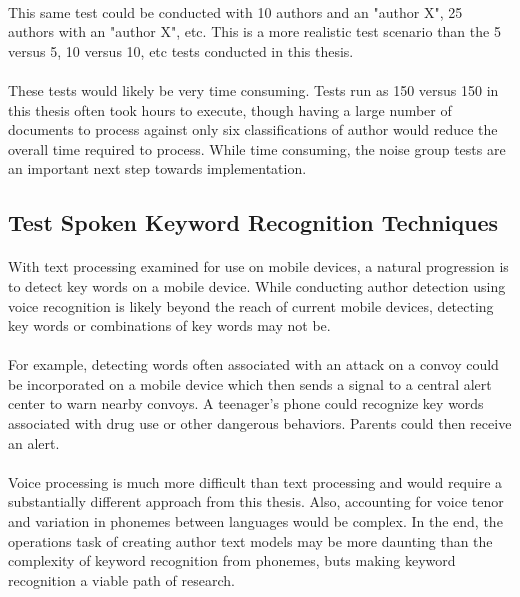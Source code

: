 \paragraph*{} This same test could be conducted with 10 authors and an "author X", 25 authors with an "author X", etc.  This is a more realistic test scenario than the 5 versus 5, 10 versus 10, etc tests conducted in this thesis.  
\paragraph*{} These tests would likely be very time consuming.  Tests run as 150 versus 150 in this thesis often took hours to execute, though having a large number of documents to process against only six classifications of author would reduce the overall time required to process.  While time consuming, the noise group tests are an important next step towards implementation.

\subsection{Test Spoken Keyword Recognition Techniques} 
\paragraph*{}With text processing examined for use on mobile devices, a natural progression is to detect key words on a mobile device.  While conducting author detection using voice recognition is likely beyond the reach of current mobile devices, detecting key words or combinations of key words may not be.
\paragraph*{} For example, detecting words often associated with an attack on a convoy could be incorporated on a mobile device which then sends a signal to a central alert center to warn nearby convoys.  A teenager's phone could recognize key words associated with drug use or other dangerous behaviors.  Parents could then receive an alert.
\paragraph*{} Voice processing is much more difficult than text processing and would require a substantially different approach from this thesis.  Also, accounting for voice tenor and variation in phonemes between languages would be complex. In the end, the operations task of creating author text models may be more daunting than the complexity of keyword recognition from phonemes, buts making keyword recognition a viable path of research.


